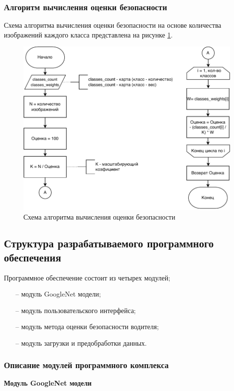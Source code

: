 \subsubsection{Алгоритм вычисления оценки безопасности}
Схема алгоритма вычисления оценки безопасности на основе количества изображений каждого класса представлена на рисунке \ref{fig:assesment}.

\begin{figure}[hbtp]
	\centering
	\includegraphics[scale=1]{img/assesment.pdf}
	\caption{Схема алгоритма вычисления оценки безопасности}
	\label{fig:assesment}
\end{figure}
\clearpage

\subsection{Структура разрабатываемого программного обеспечения}
Программное обеспечение состоит из четырех модулей;
\begin{itemize}[leftmargin=1.6\parindent]
	\item[--] модуль GoogleNet модели;
	\item[--] модуль пользовательского интерфейса;
	\item[--] модуль метода оценки безопасности водителя;
	\item[--] модуль загрузки и предобработки данных.
\end{itemize}


\subsubsection{Описание модулей программного комплекса}
\textbf{Модуль GoogleNet модели}

